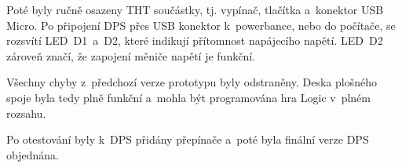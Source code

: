   Poté byly ručně osazeny THT součástky, tj. vypínač, tlačítka a~konektor USB Micro. Po připojení DPS přes USB konektor k~powerbance, 
  nebo do počítače, se rozsvítí LED~D1~a~D2, které indikují přítomnost napájecího napětí. LED~D2 zároveň značí, že zapojení měniče
  napětí je funkční.

  Všechny chyby z~předchozí verze prototypu byly odstraněny. Deska plošného spoje byla tedy plně funkční a~mohla být programována hra Logic v~plném rozsahu.
  
  Po otestování byly k~DPS přidány přepínače a~poté byla finální verze DPS objednána.

  

 
  





